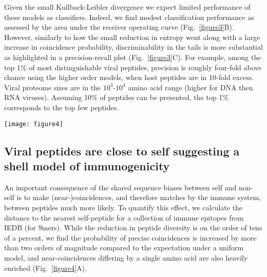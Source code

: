 \documentclass[superscriptaddress,twocolumn,pre]{revtex4}
\newcommand{\<}{\langle}
\renewcommand{\>}{\rangle}
\begin{document}
Given the small Kullback-Leibler divergence we expect limited performance of these models as classifiers. Indeed, we find modest classification performance as assessed by the area under the receiver operating curve (Fig.~\ref{figure3}B). However, similarly to how the small reduction in entropy went along with a large increase in coincidence probability, discriminability in the tails is more substantial as highlighted in a precision-recall plot (Fig.~\ref{figure3}C). For example, among the top 1\% of most distinguishable viral peptides, precision is roughly four-fold above chance using the higher order models, when host peptides are in 10-fold excess. Viral proteome sizes are in the $10^3$-$10^4$ amino acid range (higher for DNA then RNA viruses). Assuming 10\% of peptides can be presented, the top 1\% corresponds to the top few peptides.



\begin{figure*}
    \begin{center}
        \texttt{[image: figure4]}
    \end{center}
    \caption{
        {\bf A theory of immune discrimination in the light of shared proteome biases.}
        (A) Distribution of distances to the nearest self peptide for peptides from human viruses, their modelled distribution, and a null model with a uniform distribution over all $20^9$ kmers. (B) Odds ratio with which viral peptides at a certain distance to self are encountered. (C) Schematic of a shell-model of non-self peptide recognition where the immune systems biases its search based on more likely “close to self” peptides. 
    \label{figure4}
    }
\end{figure*}

\subsection{Viral peptides are close to self suggesting a shell model of immunogenicity}

An important consequence of the shared sequence biases between self and non-self is to make (near-)coincidences, and therefore matches by the immune system, between peptides much more likely. To quantify this effect, we calculate the distance to the nearest self-peptide for a collection of immune epitopes from IEDB (for 9mers). While the reduction in peptide diversity is on the order of tens of a percent, we find the probability of precise coincidences is increased by more than two orders of magnitude compared to the expectation under a uniform model, and near-coincidences differing by a single amino acid are also heavily enriched (Fig.~\ref{figure4}A).
\end{document}
